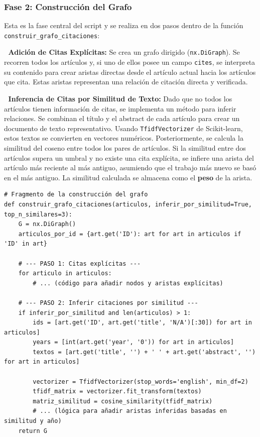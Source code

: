 \documentclass[10pt,a4paper]{article}
\begin{document}
\subsubsection{Fase 2: Construcción del Grafo}
Esta es la fase central del script y se realiza en dos pasos dentro de la función \texttt{construir\_grafo\_citaciones}:

\begin{enumerate}
     \textbf{Adición de Citas Explícitas:} Se crea un grafo dirigido (\texttt{nx.DiGraph}). Se recorren todos los artículos y, si uno de ellos posee un campo \texttt{cites}, se interpreta su contenido para crear aristas directas desde el artículo actual hacia los artículos que cita. Estas aristas representan una relación de citación directa y verificada.
    
     \textbf{Inferencia de Citas por Similitud de Texto:} Dado que no todos los artículos tienen información de citas, se implementa un método para inferir relaciones. Se combinan el título y el abstract de cada artículo para crear un documento de texto representativo. Usando \texttt{TfidfVectorizer} de Scikit-learn, estos textos se convierten en vectores numéricos. Posteriormente, se calcula la similitud del coseno entre todos los pares de artículos. Si la similitud entre dos artículos supera un umbral y no existe una cita explícita, se infiere una arista del artículo más reciente al más antiguo, asumiendo que el trabajo más nuevo se basó en el más antiguo. La similitud calculada se almacena como el \textbf{peso} de la arista.
\end{enumerate}

\begin{verbatim}
# Fragmento de la construcción del grafo
def construir_grafo_citaciones(articulos, inferir_por_similitud=True, top_n_similares=3):
    G = nx.DiGraph()
    articulos_por_id = {art.get('ID'): art for art in articulos if 'ID' in art}

    # --- PASO 1: Citas explícitas ---
    for articulo in articulos:
        # ... (código para añadir nodos y aristas explícitas)

    # --- PASO 2: Inferir citaciones por similitud ---
    if inferir_por_similitud and len(articulos) > 1:
        ids = [art.get('ID', art.get('title', 'N/A')[:30]) for art in articulos]
        years = [int(art.get('year', '0')) for art in articulos]
        textos = [art.get('title', '') + ' ' + art.get('abstract', '') for art in articulos]

        vectorizer = TfidfVectorizer(stop_words='english', min_df=2)
        tfidf_matrix = vectorizer.fit_transform(textos)
        matriz_similitud = cosine_similarity(tfidf_matrix)
        # ... (lógica para añadir aristas inferidas basadas en similitud y año)
    return G
\end{verbatim}
\end{document}
